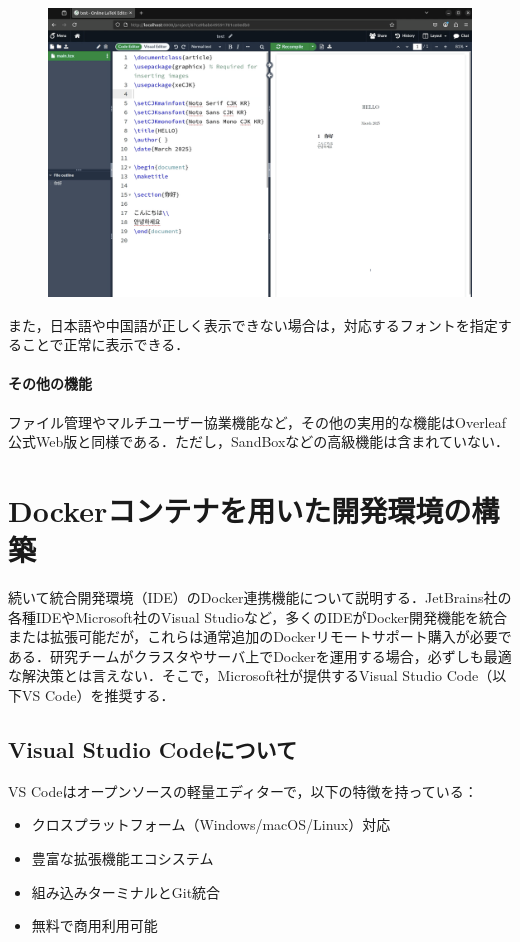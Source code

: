 \begin{figure}[H]
    \centering
    \includegraphics[width=0.8\linewidth]{images/Pasted image 20250307180333.png}
\end{figure}

また，日本語や中国語が正しく表示できない場合は，対応するフォントを指定することで正常に表示できる．
    
\paragraph{その他の機能}
ファイル管理やマルチユーザー協業機能など，その他の実用的な機能はOverleaf公式Web版と同様である．ただし，SandBoxなどの高級機能は含まれていない．


\section{Dockerコンテナを用いた開発環境の構築}
続いて統合開発環境（IDE）のDocker連携機能について説明する．JetBrains社の各種IDEやMicrosoft社のVisual Studioなど，多くのIDEがDocker開発機能を統合または拡張可能だが，これらは通常追加のDockerリモートサポート購入が必要である．研究チームがクラスタやサーバ上でDockerを運用する場合，必ずしも最適な解決策とは言えない．そこで，Microsoft社が提供するVisual Studio Code（以下VS Code）を推奨する．

\subsection*{Visual Studio Codeについて}
VS Codeはオープンソースの軽量エディターで，以下の特徴を持っている：
\begin{itemize}
\item クロスプラットフォーム（Windows/macOS/Linux）対応
\item 豊富な拡張機能エコシステム
\item 組み込みターミナルとGit統合
\item 無料で商用利用可能
\end{itemize}


